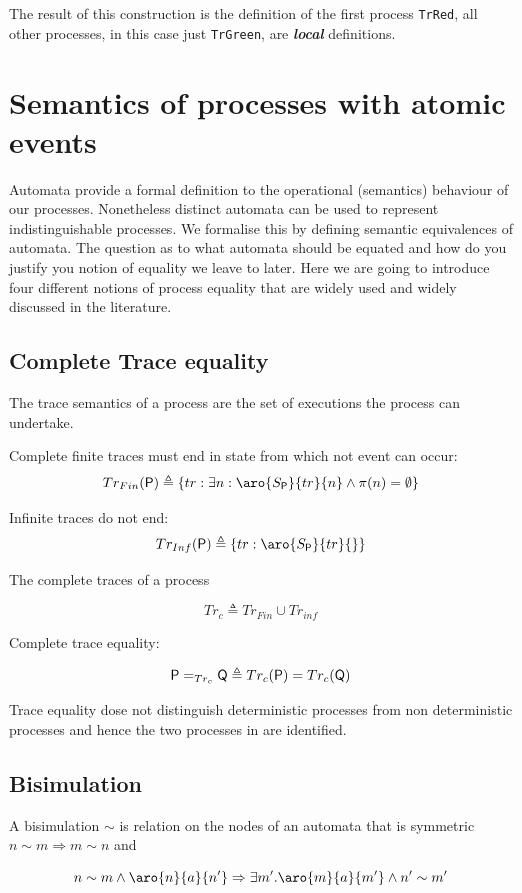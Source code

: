 \documentclass[]{article}
\begin{document}
  The result of this construction is the definition of the first process \verb$TrRed$, all other processes, in this case just  \verb$TrGreen$, are  {\bf \it local} definitions.

\section{Semantics of processes with atomic events}
 Automata provide a formal definition to the operational (semantics) behaviour of our processes. Nonetheless distinct automata can be used to  represent indistinguishable  processes. We formalise this by defining semantic equivalences  of automata.  The question as to what automata should be equated and how do you justify you notion of equality we leave to later. Here we are going to introduce four  different notions of process equality that are widely used and widely discussed in the literature.




 \subsection{Complete Trace equality}\label{sec:Trc}
 The trace semantics of a process are the set of executions the process can undertake.

 Complete finite traces must end in state from which not event can occur:
 \[Tr_{Fin}({\sf P}) \triangleq \{ tr : \exists n : \aro{S_{\sf P} }{tr}{n}\land \pi(n)=\emptyset\}\]

 Infinite traces  do not end:
 \[Tr_{Inf}({\sf P}) \triangleq \{ tr :  \aro{S_{\sf P} }{tr}{}\}\]

 The  complete traces of a process

 \[Tr_c \triangleq Tr_{Fin}\cup Tr_{inf}\]

 Complete trace equality:

 \[{\sf P} =_{Tr_c} {\sf Q} \triangleq Tr_c({\sf P}) = Tr_c({\sf Q})\]

Trace equality dose not distinguish deterministic processes from non deterministic processes  and hence the two processes in  are identified.
 \subsection{Bisimulation}\label{sec:biscol}
  A bisimulation  $\sim$ is relation on the nodes of an automata  that is  symmetric  $n\sim m\Rightarrow m\sim n$  and

 \[ n\sim m \land \aro{n}{a}{n'}\Rightarrow \exists m' . \aro{m}{a}{m'} \land n'\sim m' \]
\end{document}
